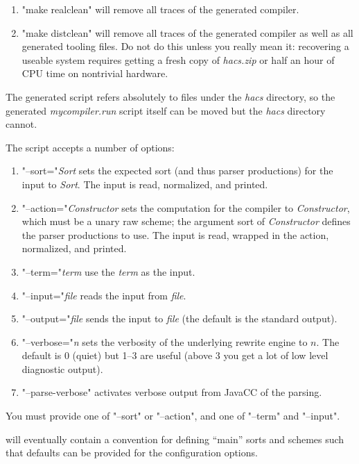 \documentclass[11pt]{article} %
\begin{document}
\begin{manual}
\begin{enumerate}
  \item "make realclean" will remove all traces of the generated compiler.

  \item "make distclean" will remove all traces of the generated compiler as well as all generated
    \HAX tooling files. Do not do this unless you really mean it: recovering a useable \HAX system
    requires getting a fresh copy of \emph{hacs.zip} or half an hour of CPU time on nontrivial
    hardware.

  \end{enumerate}
  The generated script refers absolutely to files under the \emph{hacs} directory, so the generated
  \emph{mycompiler.run} script itself can be moved but the \emph{hacs} directory cannot.

  The script accepts a number of options:
  \begin{enumerate}

  \item "--sort="\emph{Sort} sets the expected sort (and thus parser productions) for the input to
    \emph{Sort}. The input is read, normalized, and printed.

  \item "--action="\emph{Constructor} sets the computation for the compiler to \emph{Constructor},
    which must be a unary raw scheme; the argument sort of \emph{Constructor} defines the parser
    productions to use.  The input is read, wrapped in the action, normalized, and printed.

  \item "--term="\emph{term} use the \emph{term} as the input.

  \item "--input="\emph{file} reads the input from \emph{file}.

  \item "--output="\emph{file} sends the input to \emph{file} (the default is the standard output).

  \item "--verbose="\emph{n} sets the verbosity of the underlying \CRSX rewrite engine to $n$. The
    default is 0 (quiet) but 1--3 are useful (above 3 you get a lot of low level diagnostic output).

  \item "--parse-verbose" activates verbose output from JavaCC of the parsing.

  \end{enumerate}
  You must provide one of "--sort" or "--action", and one of "--term" and "--input".

  \HAX will eventually contain a convention for defining ``main'' sorts and schemes such that
  defaults can be provided for the configuration options.
\end{manual}
\end{document}

